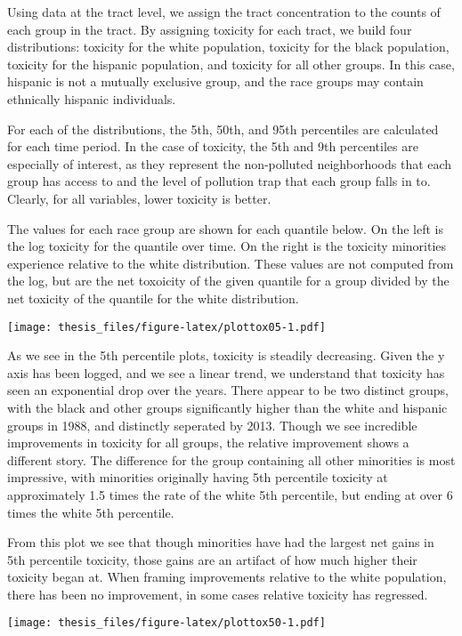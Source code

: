 \documentclass[12pt,twoside]{dukestatscithesis}
\theoremstyle{definition}
\theoremstyle{definition}
\theoremstyle{definition}
\theoremstyle{remark}
\begin{document}
Using data at the tract level, we assign the tract concentration to the
counts of each group in the tract. By assigning toxicity for each tract,
we build four distributions: toxicity for the white population, toxicity
for the black population, toxicity for the hispanic population, and
toxicity for all other groups. In this case, hispanic is not a mutually
exclusive group, and the race groups may contain ethnically hispanic
individuals.

For each of the distributions, the 5th, 50th, and 95th percentiles are
calculated for each time period. In the case of toxicity, the 5th and
9th percentiles are especially of interest, as they represent the
non-polluted neighborhoods that each group has access to and the level
of pollution trap that each group falls in to. Clearly, for all
variables, lower toxicity is better.

The values for each race group are shown for each quantile below. On the
left is the log toxicity for the quantile over time. On the right is the
toxicity minorities experience relative to the white distribution. These
values are not computed from the log, but are the net toxoicity of the
given quantile for a group divided by the net toxicity of the quantile
for the white distribution.

\texttt{[image: thesis\_files/figure-latex/plottox05-1.pdf]}

As we see in the 5th percentile plots, toxicity is steadily decreasing.
Given the y axis has been logged, and we see a linear trend, we
understand that toxicity has seen an exponential drop over the years.
There appear to be two distinct groups, with the black and other groups
significantly higher than the white and hispanic groups in 1988, and
distinctly seperated by 2013. Though we see incredible improvements in
toxicity for all groups, the relative improvement shows a different
story. The difference for the group containing all other minorities is
most impressive, with minorities originally having 5th percentile
toxicity at approximately 1.5 times the rate of the white 5th
percentile, but ending at over 6 times the white 5th percentile.

From this plot we see that though minorities have had the largest net
gains in 5th percentile toxicity, those gains are an artifact of how
much higher their toxicity began at. When framing improvements relative
to the white population, there has been no improvement, in some cases
relative toxicity has regressed.

\texttt{[image: thesis\_files/figure-latex/plottox50-1.pdf]}
\end{document}
